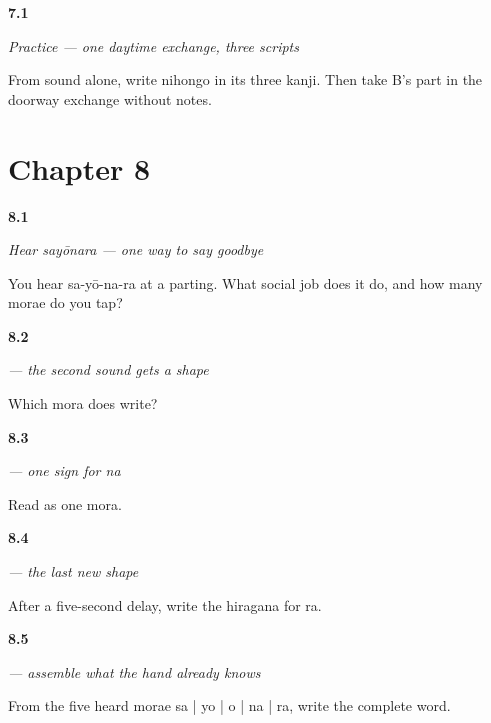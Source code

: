 \noindent\begin{minipage}[t]{\linewidth}
\raggedright
\hypertarget{review-JA-C01-practice-four-skills}{\textbf{7.1}} \emph{Practice — one daytime exchange, three scripts}\par
\small From sound alone, write nihongo in its three kanji. Then take B's part in the doorway exchange without notes.
\end{minipage}\par\medskip

\section*{Chapter 8}

\noindent\begin{minipage}[t]{\linewidth}
\raggedright
\hypertarget{review-JA-C08-hear-sayounara-meaning}{\textbf{8.1}} \emph{Hear \emph{sayōnara} — one way to say goodbye}\par
\small You hear sa-yō-na-ra at a parting. What social job does it do, and how many morae do you tap?
\end{minipage}\par\medskip

\noindent\begin{minipage}[t]{\linewidth}
\raggedright
\hypertarget{review-JA-W08-yo-read}{\textbf{8.2}} \emph{ — the second sound gets a shape}\par
\small Which mora does  write?
\end{minipage}\par\medskip

\noindent\begin{minipage}[t]{\linewidth}
\raggedright
\hypertarget{review-JA-W08-na-read}{\textbf{8.3}} \emph{ — one sign for \emph{na}}\par
\small Read  as one mora.
\end{minipage}\par\medskip

\noindent\begin{minipage}[t]{\linewidth}
\raggedright
\hypertarget{review-JA-W08-ra-write}{\textbf{8.4}} \emph{ — the last new shape}\par
\small After a five-second delay, write the hiragana for ra.
\end{minipage}\par\medskip

\noindent\begin{minipage}[t]{\linewidth}
\raggedright
\hypertarget{review-JA-W08-sayounara-read-build}{\textbf{8.5}} \emph{ — assemble what the hand already knows}\par
\small From the five heard morae sa | yo | o | na | ra, write the complete word.
\end{minipage}\par\medskip

